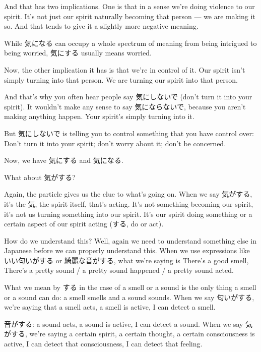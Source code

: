 And that has two implications. One is that in a sense we're doing violence to our spirit. It's not just our spirit naturally becoming that person --- we are making it so. And that tends to give it a slightly more negative meaning.

While 気になる can occupy a whole spectrum of meaning from being intrigued to being worried, 気にする usually means worried.

Now, the other implication it has is that we're in control of it. Our spirit isn't simply turning into that person. We are turning our spirit into that person.

And that's why you often hear people say 気にしないで (don't turn it into your spirit). It wouldn't make any sense to say 気にならないで, because you aren't making anything happen. Your spirit's simply turning into it.

But 気にしないで is telling you to control something that you have control over: Don't turn it into your spirit; don't worry about it; don't be concerned.

Now, we have 気にする and 気になる.

\stopsectionlevel

\startsectionlevel[title={気がする},reference={気がする}]

What about 気がする?

Again, the particle gives us the clue to what's going on. When we say 気がする, it's the 気, the spirit itself, that's acting. It's not something becoming our spirit, it's not us turning something into our spirit. It's our spirit doing something or a certain aspect of our spirit acting (する, do or act).

How do we understand this? Well, again we need to understand something else in Japanese before we can properly understand this. When we use expressions like いい匂いがする or 綺麗な音がする, what we're saying is There's a good smell, There's a pretty sound / a pretty sound happened / a pretty sound acted.

{}

What we mean by する in the case of a smell or a sound is the only thing a smell or a sound can do: a smell smells and a sound sounds. When we say 匂いがする, we're saying that a smell acts, a smell is active, I can detect a smell.

音がする: a sound acts, a sound is active, I can detect a sound. When we say 気がする, we're saying a certain spirit, a certain thought, a certain consciousness is active, I can detect that consciousness, I can detect that feeling.

